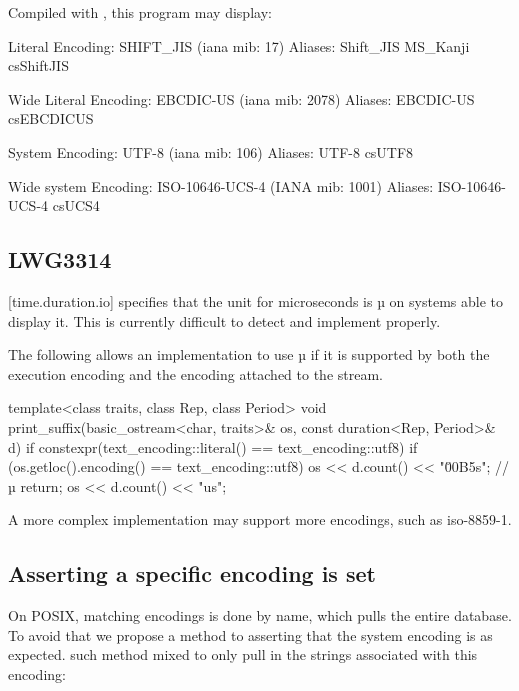 \documentclass{wg21}
\begin{document}
Compiled with , this program may display:

\begin{colorblock}
    Literal Encoding: SHIFT_JIS (iana mib: 17)
    Aliases:
        Shift_JIS
        MS_Kanji
        csShiftJIS
    
    Wide Literal Encoding: EBCDIC-US (iana mib: 2078)
    Aliases:
        EBCDIC-US
        csEBCDICUS
    
    System Encoding: UTF-8 (iana mib: 106)
    Aliases:
        UTF-8
        csUTF8
    
    Wide system Encoding: ISO-10646-UCS-4 (IANA mib: 1001)
    Aliases:
        ISO-10646-UCS-4
        csUCS4
\end{colorblock}

\subsection{LWG3314}

[time.duration.io] specifies that the unit for microseconds is µ on systems able to display it.
This is currently difficult to detect and implement properly.

The following allows an implementation to use µ if it is supported by both the execution encoding and the encoding
attached to the stream.


\begin{colorblock}
    template<class traits, class Rep, class Period>
    void print_suffix(basic_ostream<char, traits>& os, const duration<Rep, Period>& d)
    {
        if constexpr(text_encoding::literal() == text_encoding::utf8) {
            if (os.getloc().encoding() == text_encoding::utf8) {
                os << d.count() << "\u00B5s"; // µ
                return;
            }
        }
        os << d.count() << "us";
    }
\end{colorblock}

A more complex implementation may support more encodings, such as iso-8859-1.

\subsection{Asserting a specific encoding is set}

On POSIX, matching encodings is done by name, which pulls the entire database.
To avoid that we propose a method to asserting that the system encoding is as expected.
such method mixed to only pull in the strings associated with this encoding:
\end{document}
